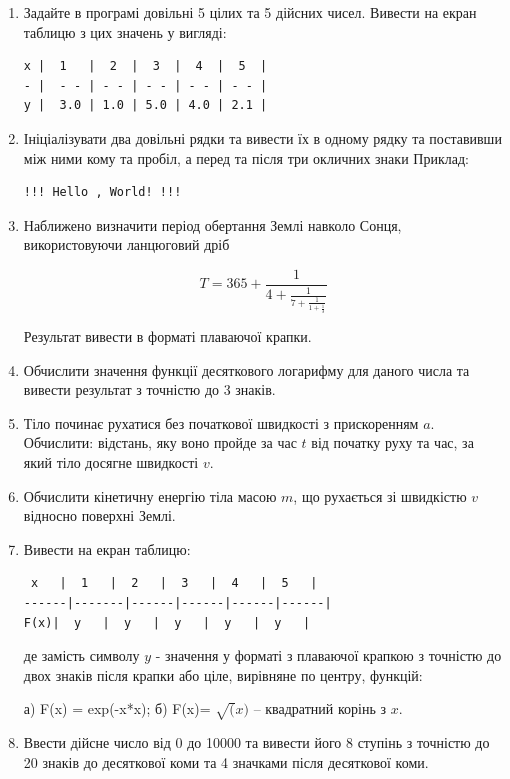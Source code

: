 \documentclass[a5paper,titlepage,openany,twoside,draft]{book_unv}%
\begin{document}
\begin{enumerate}
\def\labelenumi{\arabic{enumi}.}
\setcounter{enumi}{9}
\item
  Задайте в програмі довільні 5 цілих та 5 дійсних чисел. Вивести на екран таблицю
з цих значень у вигляді:
\begin{verbatim}
x |  1   |  2  |  3  |  4  |  5  |
- |  - - | - - | - - | - - | - - |
y |  3.0 | 1.0 | 5.0 | 4.0 | 2.1 |
\end{verbatim}

\item
  Ініціалізувати два довільні рядки та вивести їх в одному рядку та 
поставивши між ними кому та пробіл, а перед та після три окличних знаки
  Приклад:
\begin{verbatim}
!!! Hello , World! !!!
\end{verbatim}
\item
  Наближено визначити період обертання Землі навколо Сонця,
  використовуючи ланцюговий дріб

\[T = 365 + \frac{1}{4 + \frac{1}{7 + \frac{1}{1 + \frac{1}{3}}}}\]

Результат вивести в форматі плаваючої крапки.

\item
  Обчислити значення функції десяткового логарифму для даного числа та
  вивести результат з точністю до 3 знаків.
\item
  Тіло починає рухатися без початкової швидкості з прискоренням
  \(a\). Обчислити: відстань, яку воно пройде за час \(t\) від початку руху та
час, за який тіло досягне швидкості \(v\).

\item
  Обчислити кінетичну енергію тіла масою \(m\), що рухається зі
  швидкістю \(v\) відносно поверхні Землі.
\item
  Вивести на екран таблицю:
\begin{verbatim}
 x   |  1   |  2   |  3   |  4   |  5   |
------|-------|------|------|------|------|
F(x)|  y   |  y   |  y   |  y   |  y   |
\end{verbatim}

де замість символу $y$ - значення у форматі з плаваючої крапкою з точністю
до двох знаків після крапки або ціле, вирівняне по центру, функцій:

а) F(x) = exp(-x*x); б) F(x)= $\sqrt(x)$ -- квадратний корінь з $x$.

\item
  Ввести дійсне число від 0 до 10000 та вивести його 8 ступінь з
  точністю до 20 знаків до десяткової коми та 4 значками після
  десяткової коми.


\end{enumerate}
\end{document}
